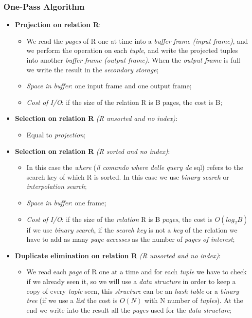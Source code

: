 \documentclass{article}
\begin{document}
\subsubsection{One-Pass Algorithm}

\begin{itemize}
\item \textbf{Projection on relation R}:
\begin{itemize}
\item We read the \emph{pages} of R one at time into a \emph{buffer frame (input frame)}, and we perform the operation on each \emph{tuple}, and write the projected tuples into another \emph{buffer frame (output frame)}. When the \emph{output frame} is full we write the result in the \emph{secondary storage};
\item \emph{Space in buffer}: one input frame and one output frame;
\item \emph{Cost of I/O}: if the size of the relation R is B pages, the cost is B;
\end{itemize}
\item \textbf{Selection on relation R}\emph{ (R unsorted and no index)}:
\begin{itemize}
\item Equal to \emph{projection};
\end{itemize}
\item \textbf{Selection on relation R}\emph{ (R sorted and no index)}:
\begin{itemize}
\item In this case the \emph{where} (\emph{il comando where delle query de }sql) refers to the search key of which R is sorted. In this case we use \emph{binary search} or \emph{interpolation search};
\item \emph{Space in buffer}: one frame;
\item \emph{Cost of I/O}: if the size of the \emph{relation} R is B \emph{pages}, the cost is $O(log_2B)$ if we use \emph{binary search}, if the \emph{search key} is not a \emph{key} of the relation we have to add as many \emph{page accesses} as the number of \emph{pages of interest};
\end{itemize}
\item \textbf{Duplicate elimination on relation R}\emph{ (R unsorted and no index)}:
\begin{itemize}
\item We read each \emph{page} of R one at a time and for each \emph{tuple} we have to check if we already seen it, so we will use a \emph{data structure} in order to keep a copy of every \emph{tuple} seen, this \emph{structure} can be an \emph{hash table} or a \emph{binary tree} (if we use a \emph{list} the cost is $O(N)$ with N number of \emph{tuples}). At the end we write into the result all the \emph{pages} used for the \emph{data structure};

\end{itemize}
\end{itemize}
\end{document}
